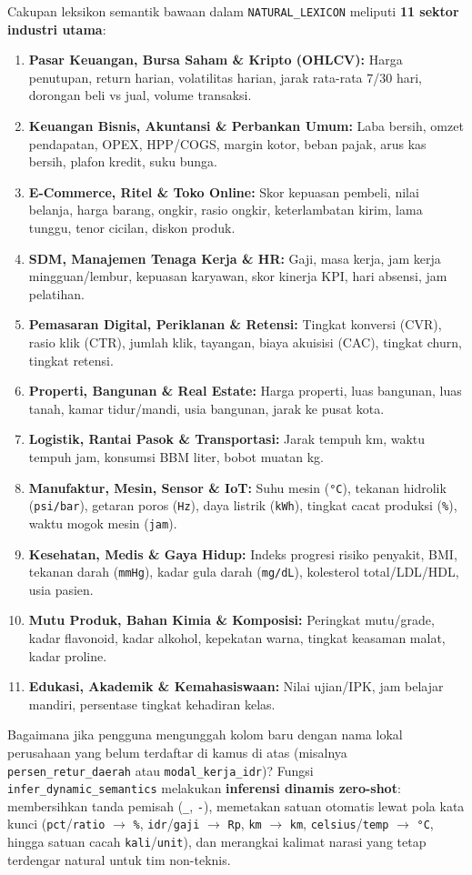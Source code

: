 \documentclass[11pt,a4paper,oneside]{book}
\newcommand{\code}[1]{{\small\nolinkurl{#1}}}
\begin{document}
Cakupan leksikon semantik bawaan dalam \code{NATURAL_LEXICON} meliputi \textbf{11 sektor industri utama}:
\begin{enumerate}
  \item \textbf{Pasar Keuangan, Bursa Saham \& Kripto (OHLCV):} Harga penutupan, return harian, volatilitas harian, jarak rata-rata 7/30 hari, dorongan beli vs jual, volume transaksi.
  \item \textbf{Keuangan Bisnis, Akuntansi \& Perbankan Umum:} Laba bersih, omzet pendapatan, OPEX, HPP/COGS, margin kotor, beban pajak, arus kas bersih, plafon kredit, suku bunga.
  \item \textbf{E-Commerce, Ritel \& Toko Online:} Skor kepuasan pembeli, nilai belanja, harga barang, ongkir, rasio ongkir, keterlambatan kirim, lama tunggu, tenor cicilan, diskon produk.
  \item \textbf{SDM, Manajemen Tenaga Kerja \& HR:} Gaji, masa kerja, jam kerja mingguan/lembur, kepuasan karyawan, skor kinerja KPI, hari absensi, jam pelatihan.
  \item \textbf{Pemasaran Digital, Periklanan \& Retensi:} Tingkat konversi (CVR), rasio klik (CTR), jumlah klik, tayangan, biaya akuisisi (CAC), tingkat churn, tingkat retensi.
  \item \textbf{Properti, Bangunan \& Real Estate:} Harga properti, luas bangunan, luas tanah, kamar tidur/mandi, usia bangunan, jarak ke pusat kota.
  \item \textbf{Logistik, Rantai Pasok \& Transportasi:} Jarak tempuh km, waktu tempuh jam, konsumsi BBM liter, bobot muatan kg.
  \item \textbf{Manufaktur, Mesin, Sensor \& IoT:} Suhu mesin (\code{°C}), tekanan hidrolik (\code{psi/bar}), getaran poros (\code{Hz}), daya listrik (\code{kWh}), tingkat cacat produksi (\texttt{\%}), waktu mogok mesin (\code{jam}).
  \item \textbf{Kesehatan, Medis \& Gaya Hidup:} Indeks progresi risiko penyakit, BMI, tekanan darah (\code{mmHg}), kadar gula darah (\code{mg/dL}), kolesterol total/LDL/HDL, usia pasien.
  \item \textbf{Mutu Produk, Bahan Kimia \& Komposisi:} Peringkat mutu/grade, kadar flavonoid, kadar alkohol, kepekatan warna, tingkat keasaman malat, kadar proline.
  \item \textbf{Edukasi, Akademik \& Kemahasiswaan:} Nilai ujian/IPK, jam belajar mandiri, persentase tingkat kehadiran kelas.
\end{enumerate}

Bagaimana jika pengguna mengunggah kolom baru dengan nama lokal perusahaan yang belum terdaftar di kamus di atas (misalnya \code{persen_retur_daerah} atau \code{modal_kerja_idr})? Fungsi \code{infer_dynamic_semantics} melakukan \textbf{inferensi dinamis zero-shot}: membersihkan tanda pemisah (\code{_}, \code{-}), memetakan satuan otomatis lewat pola kata kunci (\code{pct}/\code{ratio} $\rightarrow$ \texttt{\%}, \code{idr}/\code{gaji} $\rightarrow$ \code{Rp}, \code{km} $\rightarrow$ \code{km}, \code{celsius}/\code{temp} $\rightarrow$ \code{°C}, hingga satuan cacah \code{kali}/\code{unit}), dan merangkai kalimat narasi yang tetap terdengar natural untuk tim non-teknis.
\end{document}
